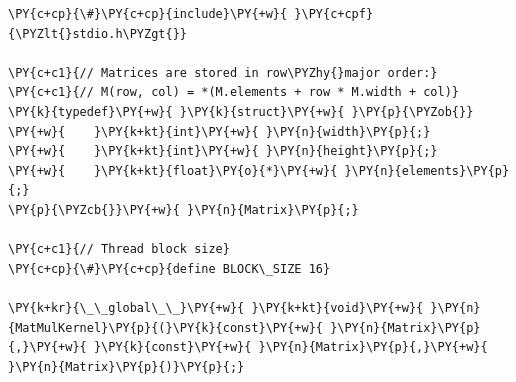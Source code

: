 \begin{Verbatim}[commandchars=\\\{\}]
\PY{c+cp}{\#}\PY{c+cp}{include}\PY{+w}{ }\PY{c+cpf}{\PYZlt{}stdio.h\PYZgt{}}

\PY{c+c1}{// Matrices are stored in row\PYZhy{}major order:}
\PY{c+c1}{// M(row, col) = *(M.elements + row * M.width + col)}
\PY{k}{typedef}\PY{+w}{ }\PY{k}{struct}\PY{+w}{ }\PY{p}{\PYZob{}}
\PY{+w}{    }\PY{k+kt}{int}\PY{+w}{ }\PY{n}{width}\PY{p}{;}
\PY{+w}{    }\PY{k+kt}{int}\PY{+w}{ }\PY{n}{height}\PY{p}{;}
\PY{+w}{    }\PY{k+kt}{float}\PY{o}{*}\PY{+w}{ }\PY{n}{elements}\PY{p}{;}
\PY{p}{\PYZcb{}}\PY{+w}{ }\PY{n}{Matrix}\PY{p}{;}

\PY{c+c1}{// Thread block size}
\PY{c+cp}{\#}\PY{c+cp}{define BLOCK\_SIZE 16}

\PY{k+kr}{\_\_global\_\_}\PY{+w}{ }\PY{k+kt}{void}\PY{+w}{ }\PY{n}{MatMulKernel}\PY{p}{(}\PY{k}{const}\PY{+w}{ }\PY{n}{Matrix}\PY{p}{,}\PY{+w}{ }\PY{k}{const}\PY{+w}{ }\PY{n}{Matrix}\PY{p}{,}\PY{+w}{ }\PY{n}{Matrix}\PY{p}{)}\PY{p}{;}
\end{Verbatim}